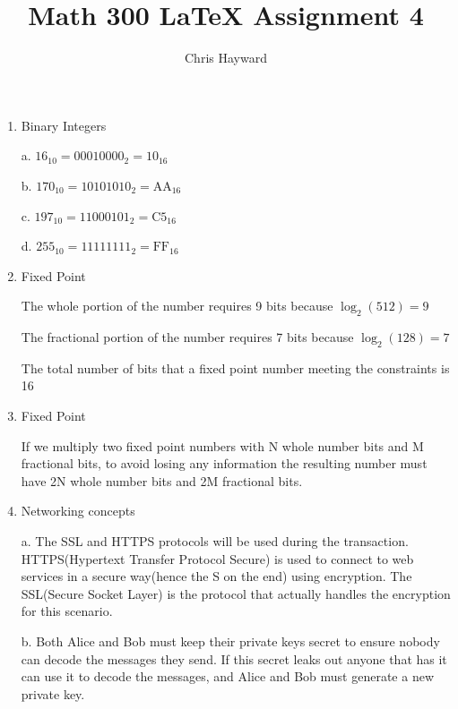 \documentclass{article}
\title{Math 300 LaTeX Assignment 4}
\author{Chris Hayward}
\begin{document}
\maketitle
\begin{enumerate}
\item{Binary Integers}

a. $16_{10}=00010000_2=10_{16}$

b. $170_{10}=10101010_2=\textrm{AA}_{16}$

c. $197_{10}=11000101_2=\textrm{C5}_{16}$

d. $255_{10}=11111111_2=\textrm{FF}_{16}$

\item{Fixed Point}

The whole portion of the number requires 9 bits because $\log_2(512)=9$

The fractional portion of the number requires 7 bits because $\log_2(128)=7$

The total number of bits that a fixed point number meeting the constraints is 16
\item{Fixed Point}

If we multiply two fixed point numbers with N whole number bits and M fractional bits, to avoid losing any information the resulting number must have 2N whole number bits and 2M fractional bits.
\item{Networking concepts}

a. The SSL and HTTPS protocols will be used during the transaction. HTTPS(Hypertext Transfer Protocol Secure) is used to connect to web services in a secure way(hence the S on the end) using encryption. The SSL(Secure Socket Layer) is the protocol that actually handles the encryption for this scenario.

b. Both Alice and Bob must keep their private keys secret to ensure nobody can decode the messages they send. If this secret leaks out anyone that has it can use it to decode the messages, and Alice and Bob must generate a new private key.
\end{enumerate}
\end{document}
